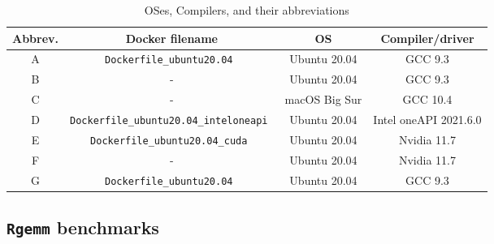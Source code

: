 \documentclass[12pt]{article}
\begin{document}
\begin{table}
{
\caption{OSes, Compilers, and their abbreviations}\label{benchmarkoscondition}
\begin{center}
\begin{tabular}{c|c|c|c}
Abbrev.  & Docker filename                        &  OS            & Compiler/driver \\ \hline
 A  & \tt Dockerfile\_ubuntu20.04                 & Ubuntu 20.04  & GCC 9.3\\
 B  &  -                                          & Ubuntu 20.04  & GCC 9.3\\
 C  &  -                                          & macOS Big Sur & GCC 10.4\\
 D  & \tt Dockerfile\_ubuntu20.04\_inteloneapi    & Ubuntu 20.04  & Intel oneAPI 2021.6.0\\
 E  & \tt Dockerfile\_ubuntu20.04\_cuda           & Ubuntu 20.04  & Nvidia 11.7 \\
 F  &  -                                          & Ubuntu 20.04  & Nvidia 11.7 \\
 G  & \tt Dockerfile\_ubuntu20.04                 & Ubuntu 20.04  & GCC 9.3   \\  \hline
\end{tabular}
\end{center}
}
\end{table}

\subsection{{\tt Rgemm} benchmarks}
\end{document}
